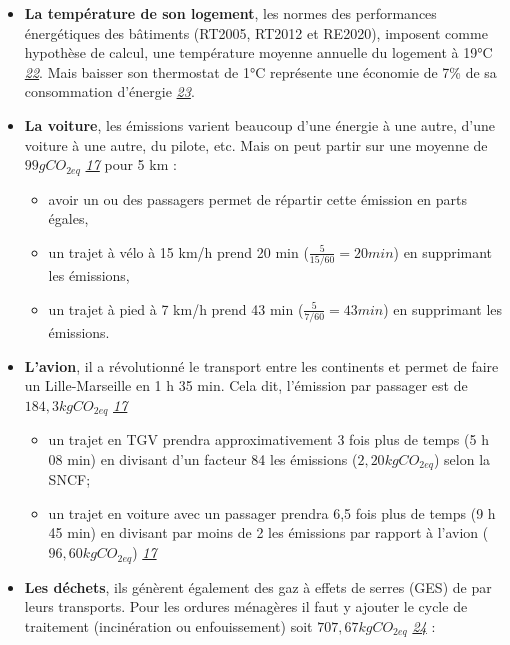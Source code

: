 \begin{itemize}
\tightlist
\item
  \textbf{La température de son logement}, les normes des performances
  énergétiques des bâtiments (RT2005, RT2012 et RE2020), imposent comme
  hypothèse de calcul, une température moyenne annuelle du logement à
  19°C
  \emph{\href{http://www.planbatimentdurable.fr/comprendre-la-rt-2012-r174.html}{22}}.
  Mais baisser son thermostat de 1°C représente une économie de 7\% de
  sa consommation d'énergie
  \emph{\href{https://librairie.ademe.fr/changement-climatique-et-energie/998-40-trucs-et-astuces-pour-economiser-l-eau-et-l-energie-9791029712784.html\#/44-type_de_produit-format_electronique}{23}}.
\item
  \textbf{La voiture}, les émissions varient beaucoup d'une énergie à
  une autre, d'une voiture à une autre, du pilote, etc. Mais on peut
  partir sur une moyenne de \(99 gCO_{2eq}\)
  \emph{\href{https://monimpacttransport.fr/}{17}} pour 5 km :

  \begin{itemize}
  \tightlist
  \item
    avoir un ou des passagers permet de répartir cette émission en parts
    égales,
  \item
    un trajet à vélo à 15 km/h prend 20 min
    (\(\frac{5}{15/60} = 20 min\)) en supprimant les émissions,
  \item
    un trajet à pied à 7 km/h prend 43 min (\(\frac{5}{7/60} = 43 min\))
    en supprimant les émissions.
  \end{itemize}
\item
  \textbf{L'avion}, il a révolutionné le transport entre les continents
  et permet de faire un Lille-Marseille en 1 h 35 min. Cela dit,
  l'émission par passager est de \(184,3 kgCO_{2eq}\)
  \emph{\href{https://monimpacttransport.fr/}{17}}

  \begin{itemize}
  \tightlist
  \item
    un trajet en TGV prendra approximativement 3 fois plus de temps (5 h
    08 min) en divisant d'un facteur 84 les émissions
    (\(2,20kgCO_{2eq}\)) selon la SNCF;
  \item
    un trajet en voiture avec un passager prendra 6,5 fois plus de temps
    (9 h 45 min) en divisant par moins de 2 les émissions par rapport à
    l'avion (\(96,60kgCO_{2eq}\))
    \emph{\href{https://monimpacttransport.fr/}{17}}
  \end{itemize}
\item
  \textbf{Les déchets}, ils génèrent également des gaz à effets de
  serres (GES) de par leurs transports. Pour les ordures ménagères il
  faut y ajouter le cycle de traitement (incinération ou enfouissement)
  soit \(707,67 kgCO_{2eq}\)
  \emph{\href{https://nosgestesclimat.fr/documentation}{24}} :


\end{itemize}
